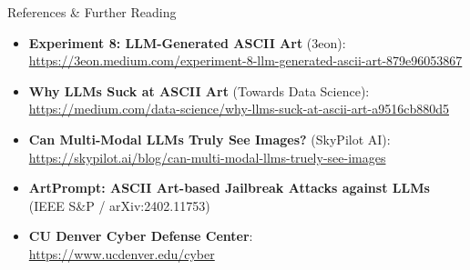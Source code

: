 \documentclass[aspectratio=169,11pt,xcolor={table,dvipsnames}]{beamer}
\begin{document}
\begin{frame}{References \& Further Reading}
  \begin{itemize}
    \item \textbf{Experiment 8: LLM-Generated ASCII Art} (3eon): \\
      \footnotesize\url{https://3eon.medium.com/experiment-8-llm-generated-ascii-art-879e96053867}
    \item \textbf{Why LLMs Suck at ASCII Art} (Towards Data Science): \\
      \footnotesize\url{https://medium.com/data-science/why-llms-suck-at-ascii-art-a9516cb880d5}
    \item \textbf{Can Multi-Modal LLMs Truly See Images?} (SkyPilot AI): \\
      \footnotesize\url{https://skypilot.ai/blog/can-multi-modal-llms-truely-see-images}
    \item \textbf{ArtPrompt: ASCII Art-based Jailbreak Attacks against LLMs} (IEEE S\&P / arXiv:2402.11753)
    \item \textbf{CU Denver Cyber Defense Center}: \\
      \footnotesize\url{https://www.ucdenver.edu/cyber}
  \end{itemize}
\end{frame}
\end{document}
